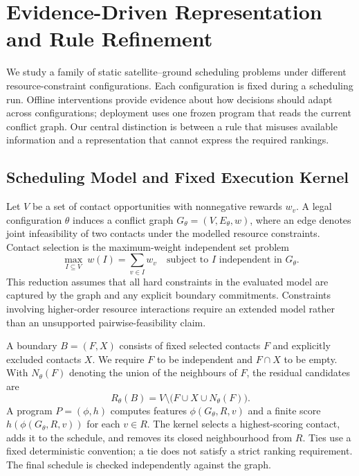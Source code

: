
\section{Evidence-Driven Representation and Rule Refinement}
\label{sec:method}

We study a family of static satellite--ground scheduling problems under
different resource-constraint configurations. Each configuration is fixed
during a scheduling run. Offline interventions provide evidence about how
decisions should adapt across configurations; deployment uses one frozen
program that reads the current conflict graph. Our central distinction is
between a rule that misuses available information and a representation that
cannot express the required rankings.

\subsection{Scheduling Model and Fixed Execution Kernel}
\label{sec:method:model}

Let $V$ be a set of contact opportunities with nonnegative rewards $w_v$.
A legal configuration $\theta$ induces a conflict graph
$G_\theta=(V,E_\theta,w)$, where an edge denotes joint infeasibility of
two contacts under the modelled resource constraints. Contact selection is
the maximum-weight independent set problem
\begin{equation}
 \max_{I\subseteq V}\ w(I)=\sum_{v\in I}w_v
 \quad\text{subject to } I\text{ independent in }G_\theta.
 \label{eq:method:mwis}
\end{equation}
This reduction assumes that all hard constraints in the evaluated model
are captured by the graph and any explicit boundary commitments.
Constraints involving higher-order resource interactions require an
extended model rather than an unsupported pairwise-feasibility claim.

A boundary $B=(F,X)$ consists of fixed selected contacts $F$ and explicitly
excluded contacts $X$. We require $F$ to be independent and $F\cap X$ to
be empty. With $N_\theta(F)$ denoting the union of the neighbours of $F$,
the residual candidates are
\begin{equation}
 R_\theta(B)=V\setminus\bigl(F\cup X\cup N_\theta(F)\bigr).
\end{equation}
A program $P=(\phi,h)$ computes features $\phi(G_\theta,R,v)$ and a finite
score $h(\phi(G_\theta,R,v))$ for each $v\in R$. The kernel selects a
highest-scoring contact, adds it to the schedule, and removes its closed
neighbourhood from $R$. Ties use a fixed deterministic convention; a tie
does not satisfy a strict ranking requirement. The final schedule is
checked independently against the graph.

